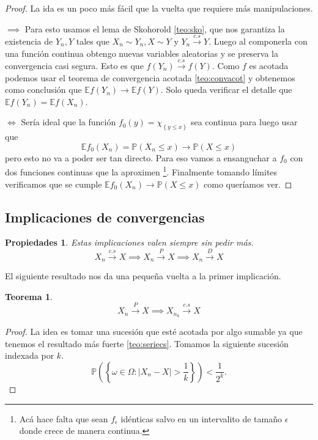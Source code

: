 \documentclass[11pt]{article}
\theoremstyle{plain} %
\newtheorem{teorema}{\color{rojo}Teorema}
\newtheorem*{props}{\color{rojo} Propiedades}
\theoremstyle{definition}
\theoremstyle{remark}
\def\Om{\Omega}
\def\E{\mathbb{E}}
\def\P{\mathbb{P}}
\def\vas{variables aleatorias }
\newcommand{\cs}{\overset{c.s}{\to}}
\newcommand{\proba}{\overset{P}{\to}}
\newcommand{\dist}{\overset{D}{\to}}
\begin{document}
\begin{proof}

	 
	 La ida es un poco más fácil que la vuelta que requiere más manipulaciones.
	 
$\implies$ Para esto usamos el lema de Skohorold \ref{teo:sko}, que nos garantiza la existencia de $Y_n, Y$ tales que $X_n \sim Y_n, X \sim Y$ y $Y_n \cs Y$. Luego al componerla  con una función continua obtengo nuevas \vas y se preserva la convergencia casi segura. Esto es que $f(Y_n) \cs f(Y)$. Como $f$ es acotada podemos usar el teorema de convergencia acotada \ref{teo:convacot} y obtenemos como conclusión que $\E f(Y_n) \to \E f(Y)$. Solo queda verificar el detalle que $\E f(Y_n) = \E f(X_n)$.
	
	$\iff$ Sería ideal que la función $f_0(y) = \chi_{\left\lbrace y \leq x\right\rbrace }$ sea continua para luego usar que 
	\[ \E f_0(X_n) = \P(X_n \leq x) \to \P(X \leq x) \]
	pero esto no va a poder ser tan directo. Para eso vamos a ensanguchar a $f_0$ con dos funciones continuas que la aproximen \footnote{Acá hace falta que sean $f_{\epsilon}$ idénticas salvo en un intervalito de tamaño $\epsilon$ donde crece de manera continua.}. Finalmente tomando límites verificamos que se cumple $\E f_0(X_n) \to \P(X \leq x)$ como queríamos ver.

\end{proof}


\subsection{Implicaciones de convergencias}

\begin{props}
	Estas implicaciones valen siempre sin pedir más. \[ X_n \cs X \implies X_n \proba X \implies X_n \dist X \]
\end{props}

El siguiente resultado nos da una pequeña vuelta a la primer implicación.

\begin{teorema}
	\[ X_n \proba X \implies X_{n_{k}} \cs X  \]
\end{teorema}

\begin{proof}
	La idea es tomar una sucesión que esté acotada por algo sumable ya que tenemos el resultado más fuerte \ref{teo:seriecs}. Tomamos la siguiente sucesión indexada por $k$.
	\[ \P  \left( \left\lbrace \omega \in \Om : |X_n - X| > \frac{1}{k} \right\rbrace \right) < \frac{1}{2^k}. \]	
	 
\end{proof}
\end{document}
